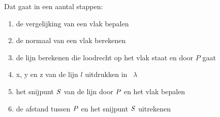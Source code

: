 \documentclass[hidelinks, a4wide, 12pt,  twoside]{book}
\begin{document}
Dat gaat in een aantal stappen:
\begin{enumerate}[label=(\alph*)]
	\item de vergelijking van een vlak bepalen
	\item de normaal van een vlak berekenen
	\item de lijn berekenen die  loodrecht op het vlak staat  en door $ P $ gaat
	\item x, y en z van de lijn $  l $  uitdrukken in \ $  \lambda $
	\item het snijpunt $\it{S}$  van de lijn door $\it{P}$  en het vlak bepalen
	\item  de afstand tussen $\it{P}$  en het snijpunt $\it{S}$  uitrekenen
\end{enumerate}	

\end{document}
